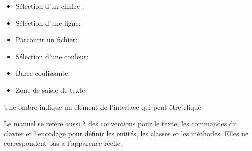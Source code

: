 \begin{itemize}
\item Sélection d'un chiffre : 
%
\item Sélection d'une ligne: 
%
%
\item Parcourir un fichier: \browsebutton 
%
\item Sélection d'une couleur: 
%
\item Barre coulissante: 
%
\item Zone de saisie de texte: 
\end{itemize}
Une ombre indique un élément de l'interface qui peut être cliqué.

% 


Le manuel se réfère aussi à des conventions pour le texte, les commandes du clavier et l'encodage pour définir les entités, les classes et les méthodes. Elles ne correspondent pas à l'apparence réelle.

